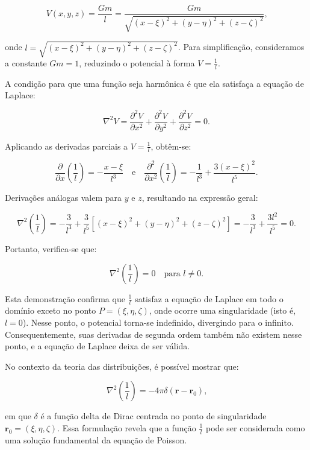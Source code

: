 \[
V(x, y, z) = \frac{Gm}{l} = \frac{Gm}{\sqrt{(x - \xi)^2 + (y - \eta)^2 + (z - \zeta)^2}} \text{,}
\]

\noindent
onde \( l = \sqrt{(x - \xi)^2 + (y - \eta)^2 + (z - \zeta)^2} \). Para simplificação, consideramos a constante \( Gm = 1 \), reduzindo o potencial à forma \( V = \frac{1}{l} \).

A condição para que uma função seja harmônica é que ela satisfaça a equação de Laplace:

\[
\nabla^2 V = \frac{\partial^2 V}{\partial x^2} + \frac{\partial^2 V}{\partial y^2} + \frac{\partial^2 V}{\partial z^2} = 0 \text{.}
\]

\noindent
Aplicando as derivadas parciais a \( V = \frac{1}{l} \), obtêm-se:

\[
\frac{\partial}{\partial x} \left( \frac{1}{l} \right) = -\frac{x - \xi}{l^3} \quad \text{e} \quad \frac{\partial^2}{\partial x^2} \left( \frac{1}{l} \right) = -\frac{1}{l^3} + \frac{3(x - \xi)^2}{l^5} \text{.}
\]

\noindent
Derivações análogas valem para \( y \) e \( z \), resultando na expressão geral:

\[
\nabla^2 \left( \frac{1}{l} \right) =
- \frac{3}{l^3} + \frac{3}{l^5} \left[(x - \xi)^2 + (y - \eta)^2 + (z - \zeta)^2\right] = -\frac{3}{l^3} + \frac{3l^2}{l^5} = 0 \text{.}
\]

\noindent
Portanto, verifica-se que:

\[
\nabla^2 \left( \frac{1}{l} \right) = 0 \quad \text{para } l \neq 0 \text{.}
\]

\noindent
Esta demonstração confirma que \( \frac{1}{l} \) satisfaz a equação de Laplace em todo o domínio exceto no ponto \( P = (\xi, \eta, \zeta) \), onde ocorre uma singularidade (isto é, \( l = 0 \)). Nesse ponto, o potencial torna-se indefinido, divergindo para o infinito. Consequentemente, suas derivadas de segunda ordem também não existem nesse ponto, e a equação de Laplace deixa de ser válida.

No contexto da teoria das distribuições, é possível mostrar que:

\[
\nabla^2 \left( \frac{1}{l} \right) = -4\pi \delta(\mathbf{r} - \mathbf{r}_0) \text{,}
\]

\noindent
em que \( \delta \) é a função delta de Dirac centrada no ponto de singularidade \( \mathbf{r}_0 = (\xi, \eta, \zeta) \). Essa formulação revela que a função \( \frac{1}{l} \) pode ser considerada como uma solução fundamental da equação de Poisson.





